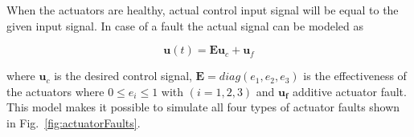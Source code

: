 When the actuators are healthy, actual control input signal will be equal to the given input signal.
In case of a fault the actual signal can be modeled as

\begin{equation}
\bm{u}\left(t\right)= \bm{E}\bm{u}_c + \bm{u}_f
\end{equation}

where $\bm{u}_c $ is the desired control signal, $\bm{E} = diag(e_1, e_2, e_3)$ is the effectiveness of the actuators where $0 \leq e_i \leq 1 $ with $(i = 1, 2 ,3)$ and $\bm{u_f}$ additive actuator fault. This model makes it possible to simulate all four types of actuator faults shown in Fig.~\ref{fig:actuatorFaults}.





